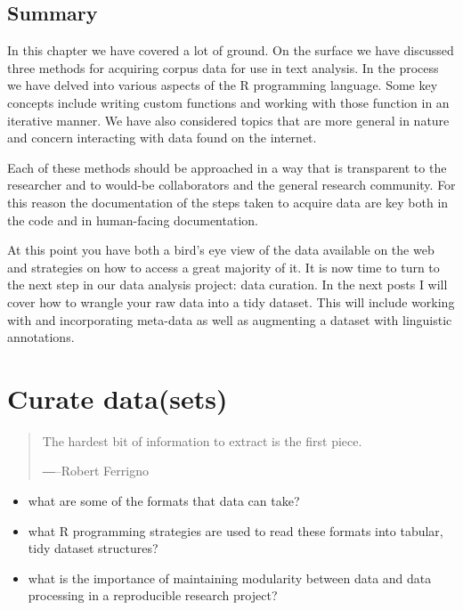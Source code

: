 \documentclass[
  letterpaper,
]{latex/krantz}
\providecommand{\tightlist}{%
  \setlength{\itemsep}{0pt}\setlength{\parskip}{0pt}}\usepackage{longtable,booktabs,array}
\begin{document}
\hypertarget{summary-5}{%
\section*{Summary}\label{summary-5}}

In this chapter we have covered a lot of ground. On the surface we have
discussed three methods for acquiring corpus data for use in text
analysis. In the process we have delved into various aspects of the R
programming language. Some key concepts include writing custom functions
and working with those function in an iterative manner. We have also
considered topics that are more general in nature and concern
interacting with data found on the internet.

Each of these methods should be approached in a way that is transparent
to the researcher and to would-be collaborators and the general research
community. For this reason the documentation of the steps taken to
acquire data are key both in the code and in human-facing documentation.

At this point you have both a bird's eye view of the data available on
the web and strategies on how to access a great majority of it. It is
now time to turn to the next step in our data analysis project: data
curation. In the next posts I will cover how to wrangle your raw data
into a tidy dataset. This will include working with and incorporating
meta-data as well as augmenting a dataset with linguistic annotations.

\hypertarget{sec-curate-datasets}{%
\chapter{Curate data(sets)}\label{sec-curate-datasets}}

\begin{quote}
The hardest bit of information to extract is the first piece.

―--Robert Ferrigno
\end{quote}

\begin{tcolorbox}[enhanced jigsaw, opacitybacktitle=0.6, breakable, colframe=quarto-callout-note-color-frame, arc=.35mm, left=2mm, leftrule=.75mm, title=\textcolor{quarto-callout-note-color}{\faInfo}\hspace{0.5em}{Keys}, opacityback=0, colback=white, toptitle=1mm, rightrule=.15mm, titlerule=0mm, bottomtitle=1mm, bottomrule=.15mm, coltitle=black, colbacktitle=quarto-callout-note-color!10!white, toprule=.15mm]

\begin{itemize}
\tightlist
\item
  what are some of the formats that data can take?
\item
  what R programming strategies are used to read these formats into
  tabular, tidy dataset structures?
\item
  what is the importance of maintaining modularity between data and data
  processing in a reproducible research project?
\end{itemize}

\end{tcolorbox}
\end{document}
